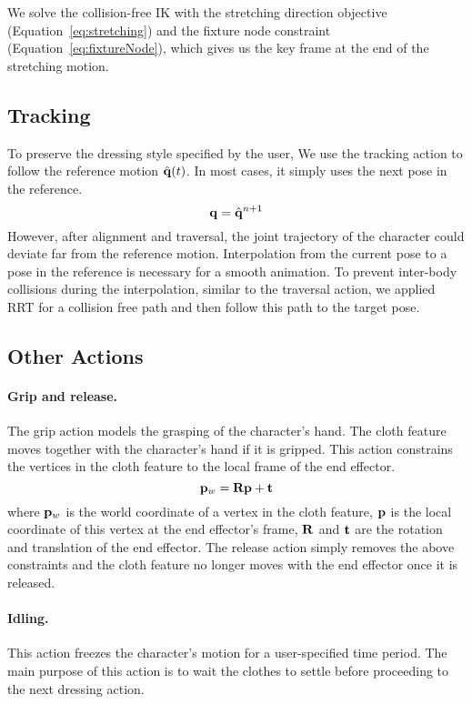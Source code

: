 We solve the collision-free IK with the stretching direction objective (Equation~\ref{eq:stretching}) and the fixture node constraint (Equation~\ref{eq:fixtureNode}), which gives us the key frame at the end of the stretching motion.


\subsection{Tracking}

To preserve the dressing style specified by the user, We use the tracking action to follow the reference motion $\hat{\mathbf{q}}(t)$. In most cases, it simply uses the next pose in the reference.
\begin{displaymath}
\mathbf{q} = \hat{\mathbf{q}}^{n+1}
\end{displaymath}
However, after alignment and traversal, the joint trajectory of the character could deviate far from the reference motion. Interpolation from the current pose to a pose in the reference is necessary for a smooth animation. To prevent inter-body collisions during the interpolation, similar to the traversal action, we applied RRT for a collision free path and then follow this path to the target pose.

\subsection{Other Actions}

\paragraph{Grip and release.}
The grip action models the grasping of the character's hand. The cloth feature moves together with the character's hand if it is gripped. This action constrains the vertices in the cloth feature to the local frame of the end effector.
\begin{displaymath}
\mathbf{p}_w = \mathbf{Rp} + \mathbf{t}
\end{displaymath}
where $\mathbf{p}_w$ is the world coordinate of a vertex in the cloth feature, $\mathbf{p}$ is the local coordinate of this vertex at the end effector's frame, $\mathbf{R}$ and $\mathbf{t}$ are the rotation and translation of the end effector. The release action simply removes the above constraints and the cloth feature no longer moves with the end effector once it is released.

\paragraph{Idling.} This action freezes the character's motion for a user-specified time period. The main purpose of this action is to wait the clothes to settle before proceeding to the next dressing action.

